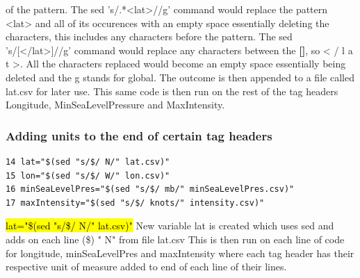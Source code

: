 \documentclass[]{article}
\begin{document}
\begin{tcolorbox}
of the pattern. The sed 's/.*<lat>//g' command would replace the pattern <lat> and all of its\newline
occurences with an empty space essentially deleting the characters, this includes any characters\newline
before the pattern. The sed 's/[</lat>]//g' command would replace any characters between the \textbf{[]},\newline
so < / l a t >. All the characters replaced would become an empty space essentially being\newline
deleted and the g stands for global. The outcome is then appended to a file called lat.csv\newline
for later use. This same code is then run on the rest of the tag headers Longitude,\newline
MinSeaLevelPressure and MaxIntensity.\newline
\end{tcolorbox}

\subsubsection{Adding units to the end of certain tag headers}
\begin{tcolorbox}[colback=white, colframe=black, boxrule=1pt, arc=2mm, 
    title=Adding units to the end of certain tag headers, width=6.7in, fonttitle=\bfseries, listing only, listing options={language=sh, basicstyle=\ttfamily}]
\begin{verbatim}
14 lat="$(sed "s/$/ N/" lat.csv)"
15 lon="$(sed "s/$/ W/" lon.csv)"
16 minSeaLevelPres="$(sed "s/$/ mb/" minSeaLevelPres.csv)"
17 maxIntensity="$(sed "s/$/ knots/" intensity.csv)"
\end{verbatim}
\hl{lat="\$(sed "s/\$/ N/" lat.csv)"}\newline
New variable lat is created which uses sed and adds on each line (\$) " N" from file lat.csv\newline
This is then run on each line of code for longitude, minSeaLevelPres and maxIntensity where each tag
header has their respective unit of measure added to end of each line of their lines.\newline
\end{tcolorbox}
\end{document}
